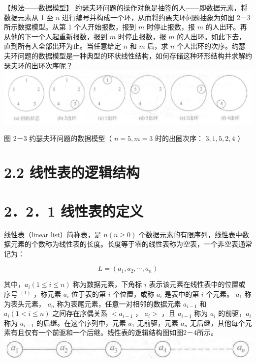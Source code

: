 \documentclass[10pt]{article}
\begin{document}
【想法——数据模型】 约瑟夫环问题的操作对象是抽签的人——即数据元素，将数据元素从 1 至 $n$ 进行编号并构成一个环，从而将约悪夫环问题抽象为如图 2－3 所示数据模型。从第 1 个人开始报数，报到 $m$ 时停止报数，报 $m$ 的人出环。再从他的下一个人起重新报数，报到 $m$ 时停止报数，报 $m$ 的人出环。如此下去，直到所有人全部出环为止。当任意给定 $n$ 和 $m$ 后，求 $n$ 个人出环的次序。约瑟夫环问题的数据模型是一种典型的环状线性结构，如何存储这种环形结构并求解约瑟夫环的出环次序呢？\\
\includegraphics[max width=\textwidth, center]{2025_06_06_704745ea57b15b2333e5g-042}

图 2－3 约瑟夫环问题的数据模型（ $n=5, m=3$ 时的出圈次序： $3,1,5,2,4$ ）

\section*{2.2 线性表的逻辑结构}
\section*{2．2．1 线性表的定义}
线性表（linear list）简称表，是 $n(n \geqslant 0)$ 个数据元素的有限序列，线性表中数据元素的个数称为线性表的长度。长度等于零的线性表称为空表，一个非空表通常记为：

$$
L=\left(a_{1}, a_{2}, \cdots, a_{n}\right)
$$

其中，$a_{i}(1 \leqslant i \leqslant n)$ 称为数据元素，下角标 $i$ 表示该元素在线性表中的位置或序号 ${ }^{(1)}$ ，称元素 $a_{i}$ 位于表的第 $i$ 个位置，或称 $a_{i}$ 是表中的第 $i$ 个元素。 $a_{1}$ 称为表头元素， $a_{n}$ 称为表尾元素，任意一对相邻的数据元素 $a_{i-1}$ 和 $a_{i}(1<i \leqslant n)$ 之间存在序偶关系 $<a_{i-1}$ ， $a_{i}>$ ，且 $a_{i-1}$ 称为 $a_{i}$ 的前驱，$a_{i}$ 称为 $a_{i-1}$ 的后继。在这个序列中，元素 $a_{1}$ 无前驱，元素 $a_{n}$ 无后继，其他每个元素有且仅有一个前驱和一个后继。线性表的逻辑结构图如图2－4所示。\\
\includegraphics[max width=\textwidth, center]{2025_06_06_704745ea57b15b2333e5g-042(1)}
\end{document}
